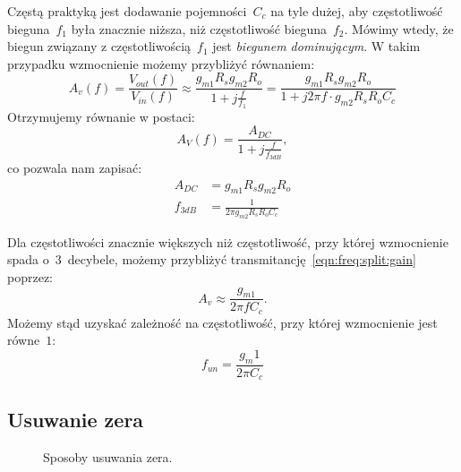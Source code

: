 \documentclass[twoside,pl,final]{labman}
\begin{document}
Częstą praktyką jest dodawanie pojemności~$C_c$ na tyle dużej,
aby częstotliwość bieguna~$f_1$ była znacznie niższa,
niż częstotliwość bieguna~$f_2$.
Mówimy wtedy, że biegun związany z częstotliwością~$f_1$ jest
\emph{biegunem dominującym}.
W takim przypadku wzmocnienie możemy przybliżyć równaniem:
\begin{equation}
  A_v(f) = \frac{V_{out}(f)}{V_{in}(f)} \approx
  \frac{g_{m1} R_s g_{m2} R_o}{1 + j \frac{f}{f_1}} =
  \frac{g_{m1} R_s g_{m2} R_o}{1 + j 2 \pi f \cdot g_{m2} R_s R_o C_c}
  \label{eqn:freq:split:gain}
\end{equation}
Otrzymujemy równanie w postaci:
\begin{equation}
  A_V(f) = \frac{A_{DC}}{1 + j \frac{f}{f_{3dB}}},
\end{equation}
co pozwala nam zapisać:
\begin{align}
  A_{DC} &= g_{m1} R_s g_{m2} R_o
  \label{eqn:freq:split:dcgain} \\
  f_{3dB} &= \frac{1}{2 \pi g_{m2} R_s R_o C_c}
  \label{eqn:freq:split:bw}
\end{align}

Dla częstotliwości znacznie większych niż częstotliwość,
przy której wzmocnienie spada o~$3$~decybele,
możemy przybliżyć transmitancję~\ref{eqn:freq:split:gain} poprzez:
\begin{equation}
  A_v \approx \frac{g_{m1}}{2 \pi f C_c}.
\end{equation}
Możemy stąd uzyskać zależność na częstotliwość,
przy której wzmocnienie jest równe~$1$:
\begin{equation}
  f_{un} = \frac{g_m1}{2 \pi C_c}
  \label{eqn:freq:unity}
\end{equation}

\subsection{Usuwanie zera}
\label{freq:zero}

\begin{figure}[!htbp]
  \centering
  \qquad
  \caption{Sposoby usuwania zera.}
  \label{fig:zero:cancel}
\end{figure}
\end{document}
